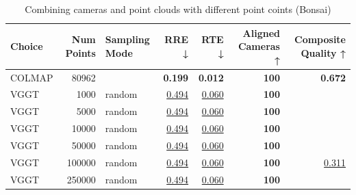 \begin{table}[H]
\caption{Combining cameras and point clouds with different point coints (Bonsai)}
\label{tab:07_combined_num_points_bonsai}
\begin{tabular}{lrlrrrr}
\toprule
Choice & Num Points & Sampling Mode & RRE ↓ & RTE ↓ & Aligned Cameras ↑ & Composite Quality ↑ \\
\midrule
COLMAP & 80962 &  & \textbf{0.199} & \textbf{0.012} & \textbf{100} & \textbf{0.672} \\
VGGT & 1000 & random & \underline{0.494} & \underline{0.060} & \textbf{100} &  \\
VGGT & 5000 & random & \underline{0.494} & \underline{0.060} & \textbf{100} &  \\
VGGT & 10000 & random & \underline{0.494} & \underline{0.060} & \textbf{100} &  \\
VGGT & 50000 & random & \underline{0.494} & \underline{0.060} & \textbf{100} &  \\
VGGT & 100000 & random & \underline{0.494} & \underline{0.060} & \textbf{100} & \underline{0.311} \\
VGGT & 250000 & random & \underline{0.494} & \underline{0.060} & \textbf{100} &  \\
\bottomrule
\end{tabular}
\end{table}
